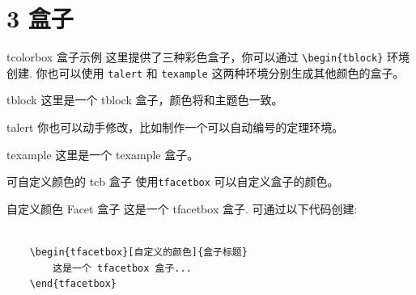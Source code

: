 \documentclass[10pt,aspectratio=169,fontset=none]{ctexbeamer}
\begin{document}
    \section{3 盒子}

    \begin{frame}{tcolorbox 盒子示例}
        这里提供了三种彩色盒子，你可以通过 \texttt{\textcolor{primary}{\textbackslash begin}\{tblock\}} 环境创建. 你也可以使用 \texttt{talert} 和 \texttt{texample} 这两种环境分别生成其他颜色的盒子。
        \begin{tblock}{tblock}
            这里是一个 tblock 盒子，颜色将和主题色一致。
        \end{tblock}
        \begin{talert}{talert}
            你也可以动手修改，比如制作一个可以自动编号的定理环境。
        \end{talert}
        \begin{texample}{texample}
            这里是一个 texample 盒子。
        \end{texample}
    \end{frame}

    \begin{frame}[fragile]{可自定义颜色的 tcb 盒子 }
        使用\texttt{tfacetbox} 可以自定义盒子的颜色。 
        \begin{tfacetbox}[nudarkyellow]{自定义颜色 Facet 盒子}
            这是一个 tfacetbox 盒子. 可通过以下代码创建:
            \begin{verbatim}

    \begin{tfacetbox}[自定义的颜色]{盒子标题}
        这是一个 tfacetbox 盒子...
    \end{tfacetbox}
            \end{verbatim}
        \end{tfacetbox}
    \end{frame}
\end{document}
